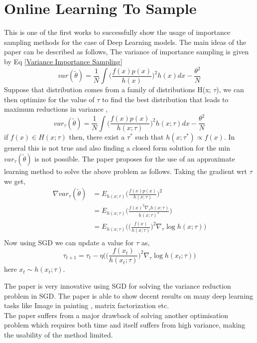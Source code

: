 \documentclass[a4paper,twoside]{iiththesis}
\theoremstyle{definition}
\theoremstyle{definition}
\theoremstyle{remark}
\begin{document}
\section{Online Learning To  Sample \cite{bouchard2015accelerating}}
This is one of the first works to successfully show the usage of importance sampling methods for the case of Deep Learning models. The main ideas of the paper can be described as follows,   
The variance of importance sampling is given by Eq \ref{Variance Importance Sampling} 
\begin{equation}
var(\widetilde{\theta}) =  \frac{1}{N}\int  \Big(\frac{f(x)p(x)}{h(x)}\Big)^2  h(x) dx  -\frac{\theta^2}{N}
\end{equation}
Suppose that distribution comes from a family of distributions H(x; $\tau$), we can then optimize for the value of $\tau$ to find the best distribution that leads to maximum reductions in variance ,
\begin{equation}
var_{\tau}(\widetilde{\theta}) = \frac{1}{N}\int  \Big(\frac{f(x)p(x)}{h(x;\tau)}\Big)^2  h(x; \tau) dx  -\frac{\theta^2}{N}
\end{equation}
if $f(x) \in H(x; \tau)$ then, there exist a $\tau^*$ such that $h(x; \tau^*) \propto f(x)$. In general this is not true and also finding a closed form solution for the min $var_\tau(\tilde\theta)$ is not possible. The paper proposes for the use of an approximate learning method to solve the above problem as follows.  Taking the gradient wrt $\tau$  we get, 
\begin{align}
\nabla var_\tau(\tilde\theta) &= E_{h(x; \tau)}\Big(\frac{f(x)p(x)}{h(x;\tau)}\Big)^2 \\
& = E_{h(x; \tau)}\Big(\frac{f(x)^2 \nabla_{\tau} h(x;\tau)}{h(x; \tau)^3}\Big)\\
&= E_{h(x; \tau)}\bigg(\Big(\frac{f(x)}{h(x;\tau)}\Big)^2 \nabla_\tau\log h(x; \tau) \bigg)\\
\end{align}
 Now using SGD we can update a value for $\tau$ as, 
 \begin{equation}
 \tau_{t+1} = \tau_{t} - \eta \bigg(\Big(\frac{f(x_t)}{h(x_t;\tau)}\Big)^2 \nabla_\tau\log h(x_t; \tau) \bigg)
\end{equation}
here $x_t \sim h(x_t; \tau)$.

The paper is very innovative using SGD for solving the variance reduction problem in SGD. The paper is able to show decent results on many deep learning tasks like Image in painting , matrix factorization etc. \\ The paper suffers from a major drawback of solving another optimisation problem which requires both time and itself suffers from high variance, making the usability of the method limited. 
\end{document}
